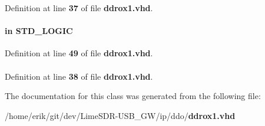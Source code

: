 Definition at line {\bf 37} of file {\bf ddrox1.\+vhd}.

\paragraph[{outclock}]{ {\bfseries \textcolor{keywordflow}{in}\textcolor{vhdlchar}{ }} {\bfseries \textcolor{comment}{S\+T\+D\+\_\+\+L\+O\+G\+IC}\textcolor{vhdlchar}{ }} \hspace{0.3cm}{\ttfamily [Port]}}\label{classddrox1_ac1114a0b9414aabbfa8346eaf305eed2}


Definition at line {\bf 49} of file {\bf ddrox1.\+vhd}.

\paragraph[{std\+\_\+logic\+\_\+1164}]{\hspace{0.3cm}{\ttfamily [Package]}}\label{classddrox1_acd03516902501cd1c7296a98e22c6fcb}


Definition at line {\bf 38} of file {\bf ddrox1.\+vhd}.



The documentation for this class was generated from the following file\+:\begin{DoxyCompactItemize}
\item 
/home/erik/git/dev/\+Lime\+S\+D\+R-\/\+U\+S\+B\+\_\+\+G\+W/ip/ddo/{\bf ddrox1.\+vhd}\end{DoxyCompactItemize}
